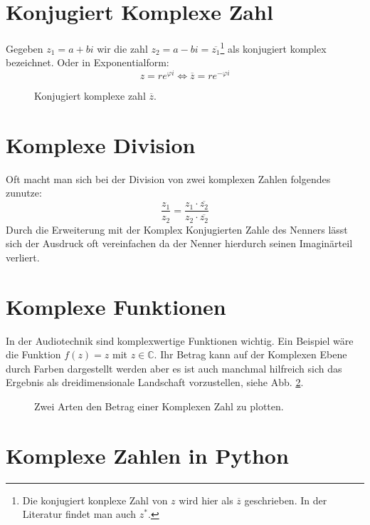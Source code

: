 \section{Konjugiert Komplexe Zahl}
Gegeben $z_1 = a + bi$ wir die zahl $z_2 = a - bi = \overline{z_1}$\footnote{Die konjugiert konplexe Zahl von $z$ wird hier als $\overline{z}$ geschrieben. In der Literatur findet man auch $z^{*}$.} als konjugiert komplex bezeichnet. Oder in Exponentialform:
$$z = re^{\varphi i} \iff \overline{z} = re^{-\varphi i}$$

\begin{figure}[h]
	\centering
	
	\caption{Konjugiert komplexe zahl $\overline{z}$.}
	\label{fig:komp_conju}
\end{figure}


\section{Komplexe Division}
Oft macht man sich bei der Division von zwei komplexen Zahlen folgendes zunutze:
\begin{equation}
\frac{z_1}{z_2} = \frac{z_1 \cdot \overline{z_2}}{z_2 \cdot \overline{z_2}} 
\end{equation} 
Durch die Erweiterung mit der Komplex Konjugierten Zahle des Nenners lässt sich der Ausdruck oft vereinfachen da der Nenner hierdurch seinen Imaginärteil verliert.


\section{Komplexe Funktionen}
In der Audiotechnik sind komplexwertige Funktionen wichtig. Ein Beispiel wäre die Funktion $f(z) = z$ mit $z \in \mathbb{C}$. Ihr Betrag kann auf der Komplexen Ebene durch Farben dargestellt werden aber es ist auch manchmal hilfreich sich das Ergebnis als dreidimensionale Landschaft vorzustellen, siehe Abb. \ref{fig:komp_3D}. 

\begin{figure}[h]
	\centering
	
	\caption{Zwei Arten den Betrag einer Komplexen Zahl zu plotten.}
	\label{fig:komp_3D}
\end{figure}



\section{Komplexe Zahlen in Python}

